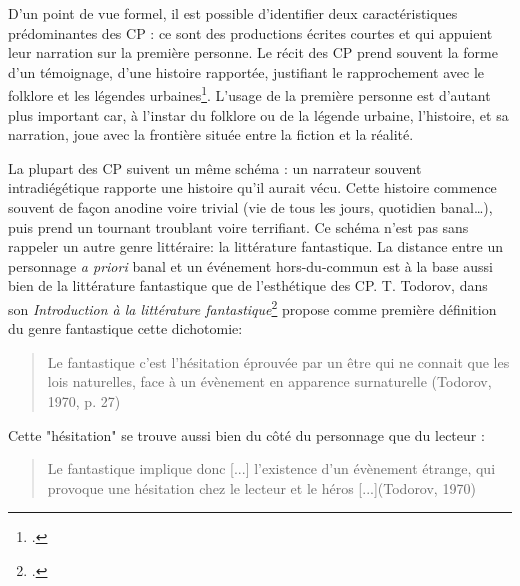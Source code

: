 \documentclass[12pt,a4paper,oneside,titlepage]{book} %
\begin{document}
\par
D’un point de vue formel, il est possible d’identifier deux caractéristiques prédominantes des CP : ce sont des productions écrites courtes et qui appuient leur narration sur la première personne. Le récit des CP prend souvent la forme d’un témoignage, d’une histoire rapportée, justifiant le rapprochement avec le folklore et les légendes urbaines\footcite{blank_slender_2018}. L’usage de la première personne est d’autant plus important car, à l’instar du folklore ou de la légende urbaine, l’histoire, et sa narration, joue avec la frontière située entre la fiction et la réalité. 
\par
La plupart des CP suivent un même schéma : un narrateur souvent intradiégétique rapporte une histoire qu’il aurait vécu. Cette histoire commence souvent de façon anodine voire trivial (vie de tous les jours, quotidien banal…), puis prend un tournant troublant voire terrifiant. 
Ce schéma n’est pas sans rappeler un autre genre littéraire: la littérature fantastique. La distance entre un personnage \emph{a priori} banal et un événement hors-du-commun est à la base aussi bien de la littérature fantastique que de l’esthétique des CP. \newline
T. Todorov, dans son \emph{Introduction à la littérature fantastique}\footcite{todorov_introductin_1992} propose comme première définition du genre fantastique cette dichotomie: 

	\begin{quotation}
Le fantastique c’est l’hésitation éprouvée par un être qui ne connait que les lois naturelles, face à un évènement en apparence surnaturelle (Todorov, 1970, p. 27)\newline
	\end{quotation}

Cette "hésitation" se trouve aussi bien du côté du personnage que du lecteur : 
\begin{quotation}
	Le fantastique implique donc [...] l’existence d’un évènement étrange, qui provoque une hésitation chez le lecteur et le héros [...](Todorov, 1970)
\end{quotation}
\end{document}
